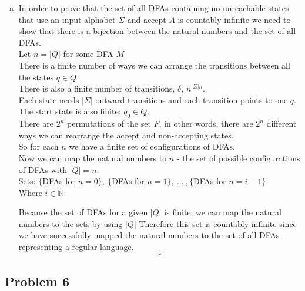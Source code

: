 \documentclass{article}
\begin{document}
\begin{enumerate}[a)]
\item

In order to prove that the set of all DFAs containing no unreachable states that use
an input alphabet $\Sigma$ and accept $A$ is countably infinite we need to show that there
is a bijection between the natural numbers and the set of all DFAs.\\[5pt]
Let $n = |Q|$ for some DFA $M$ \\
There is a finite number of ways we can arrange the transitions between all the states
$q \in Q$\\
There is also a finite number of transitions, $\delta$, $n^{|\Sigma|n}$.\\
Each state needs $|\Sigma|$ outward transitions and each transition points to one $q$.\\
The start state is also finite: $q_0 \in Q$. \\
There are $2^n$ permutations of the set $F$, in other words, there are $2^n$ different ways
we can rearrange the accept and non-accepting states.\\
So for each $n$ we have a finite set of configurations of DFAs.\\
Now we can map the natural numbers to $n$ - the set of possible configurations of DFAs with
$|Q| = n$.\\

Sets: $\{$DFAs for $n=0\},\ \{$DFAs for $ n=1\},\ ...\ ,\{$DFAs for $ n=i-1\}$\\
Where $i \in \mathbb{N}$

Because the set of DFAs for a given $|Q|$ is finite, we can map the natural numbers to the
sets by using $|Q|$ Therefore this set is countably infinite since we have successfully
mapped the natural numbers to the set of all DFAs representing a regular language.
\[\square\]


\end{enumerate}

\newpage

\subsection*{Problem 6}
\end{document}
